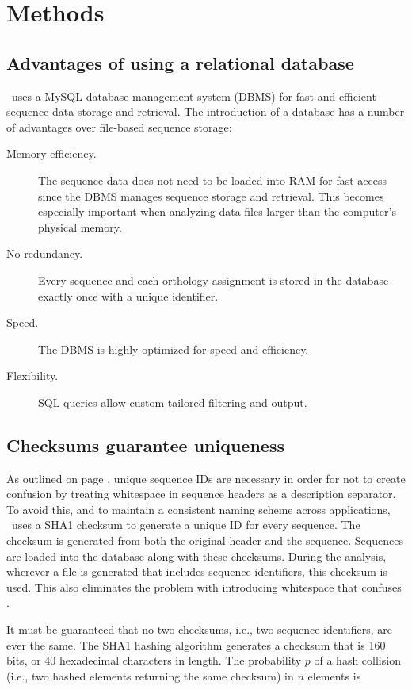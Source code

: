 \section{Methods}
\subsection{Advantages of using a relational database}
\pname~uses a MySQL database management system (DBMS) for fast and efficient
sequence data storage and retrieval. The introduction of a database has a
number of advantages over file-based sequence storage:

\begin{description}
	\item[Memory efficiency.] The sequence data does not need to be loaded into
		RAM for fast access since the DBMS manages sequence storage and retrieval.
		This becomes especially important when analyzing data files larger than the
		computer's physical memory.
	\item[No redundancy.] Every sequence and each orthology assignment is stored
		in the database exactly once with a unique identifier. 
	\item[Speed.] The DBMS is highly optimized for speed and efficiency. %
	\item[Flexibility.] SQL queries allow custom-tailored filtering and output.
\end{description}

\subsection{Checksums guarantee uniqueness}
As outlined on page \pageref{uniq}, unique sequence IDs are necessary in
order for  not to create confusion by treating whitespace in
sequence headers as a description separator. To avoid this, and to maintain a
consistent naming scheme across applications, \pname~uses a SHA1 checksum to
generate a unique ID for every sequence. The checksum is generated from both the
original header and the sequence. Sequences are loaded into the database along
with these checksums. During the analysis, wherever a file is generated that
includes sequence identifiers, this checksum is used. This also eliminates the
problem with  introducing whitespace that confuses
.

It must be guaranteed that no two checksums, i.e., two sequence identifiers, are
ever the same. The SHA1 hashing algorithm generates a checksum that is 160 bits,
or 40 hexadecimal characters in length. The probability $p$ of a hash collision
(i.e., two hashed elements returning the same checksum) in $n$ elements is

